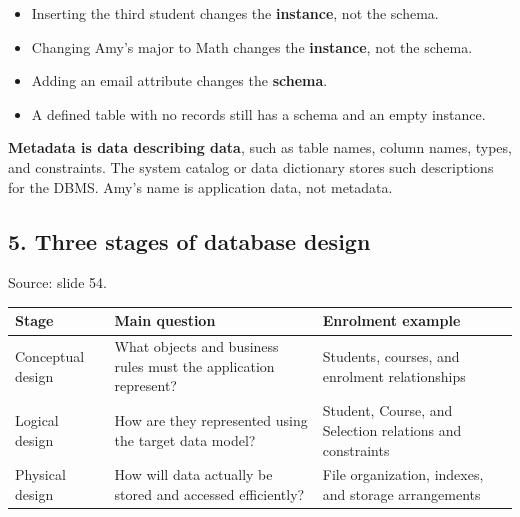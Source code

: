 \begin{itemize}
\tightlist
\item
  Inserting the third student changes the \textbf{instance}, not the schema.
\item
  Changing Amy's major to Math changes the \textbf{instance}, not the schema.
\item
  Adding an email attribute changes the \textbf{schema}.
\item
  A defined table with no records still has a schema and an empty instance.
\end{itemize}

\textbf{Metadata is data describing data}, such as table names, column names, types, and constraints. The system catalog or data dictionary stores such descriptions for the DBMS. Amy's name is application data, not metadata.

\subsection{5. Three stages of database design}\label{01_database_fundamentals_en-three-stages-of-database-design}

Source: slide 54.

\begin{longtable}[]{@{}
  >{\raggedright\arraybackslash}p{}
  >{\raggedright\arraybackslash}p{}
  >{\raggedright\arraybackslash}p{}@{}}
\toprule\noalign{}
\begin{minipage}[b]{\linewidth}\raggedright
Stage
\end{minipage} & \begin{minipage}[b]{\linewidth}\raggedright
Main question
\end{minipage} & \begin{minipage}[b]{\linewidth}\raggedright
Enrolment example
\end{minipage} \\
\midrule\noalign{}
\endhead
\bottomrule\noalign{}
\endlastfoot
Conceptual design & What objects and business rules must the application represent? & Students, courses, and enrolment relationships \\
Logical design & How are they represented using the target data model? & Student, Course, and Selection relations and constraints \\
Physical design & How will data actually be stored and accessed efficiently? & File organization, indexes, and storage arrangements \\
\end{longtable}

